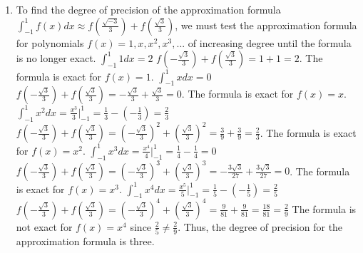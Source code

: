 \documentclass[12pt]{article}
\begin{document}
\begin{enumerate}[leftmargin=2em]
\begin{enumerate}[leftmargin=!]
        \item To find the degree of precision of the approximation formula
        \(\int _{-1}^{1}f(x)dx\approx f(\frac{\sqrt{-3}}{3})+f(\frac{\sqrt{3}}{3})\),
        we must test the approximation formula for polynomials \(f(x)=1,x,x^{2},x^{3},...\) of increasing degree until the formula is no longer exact.
        \(\int _{-1}^{1}1dx=2\)
        \(f(-\frac{\sqrt{3}}{3})+f(\frac{\sqrt{3}}{3})=1+1=2\).
        The formula is exact for \(f(x)=1\).
        \(\int _{-1}^{1}xdx=0\)
        \(f(-\frac{\sqrt{3}}{3})+f(\frac{\sqrt{3}}{3})=-\frac{\sqrt{3}}{3}+\frac{\sqrt{3}}{3}=0\).
        The formula is exact for \(f(x)=x\).
        \(\int _{-1}^{1}x^{2}dx=\frac{x^{3}}{3}\Big|_{-1}^{1}=\frac{1}{3}-(-\frac{1}{3})=\frac{2}{3}\)
        \(f(-\frac{\sqrt{3}}{3})+f(\frac{\sqrt{3}}{3})=(-\frac{\sqrt{3}}{3})^{2}+(\frac{\sqrt{3}}{3})^{2}=\frac{3}{9}+\frac{3}{9}=\frac{2}{3}\).
        The formula is exact for \(f(x)=x^{2}\).
        \(\int _{-1}^{1}x^{3}dx=\frac{x^{4}}{4}\Big|_{-1}^{1}=\frac{1}{4}-\frac{1}{4}=0\)
        \(f(-\frac{\sqrt{3}}{3})+f(\frac{\sqrt{3}}{3})=(-\frac{\sqrt{3}}{3})^{3}+(\frac{\sqrt{3}}{3})^{3}=-\frac{3\sqrt{3}}{27}+\frac{3\sqrt{3}}{27}=0\).
        The formula is exact for \(f(x)=x^{3}\).
        \(\int _{-1}^{1}x^{4}dx=\frac{x^{5}}{5}\Big|_{-1}^{1}=\frac{1}{5}-(-\frac{1}{5})=\frac{2}{5}\)
        \(f(-\frac{\sqrt{3}}{3})+f(\frac{\sqrt{3}}{3})=(-\frac{\sqrt{3}}{3})^{4}+(\frac{\sqrt{3}}{3})^{4}=\frac{9}{81}+\frac{9}{81}=\frac{18}{81}=\frac{2}{9}\)
        The formula is not exact for \(f(x)=x^{4}\) since \(\frac{2}{5}\ne \frac{2}{9}\).
        Thus, the degree of precision for the approximation formula is three.
    \end{enumerate}
\end{enumerate}
\end{document}
